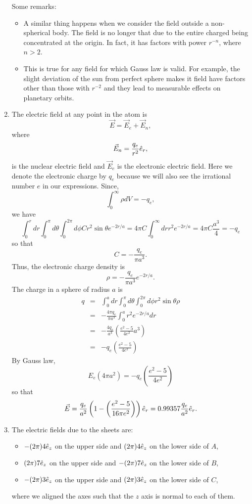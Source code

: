 \documentclass{article}
\begin{document}
\begin{enumerate}
Some remarks:
\begin{itemize}
\item A similar thing happens when we consider the field outside a non-spherical
body. The field is no longer that due to the entire charged being concentrated at 
the origin. In fact, it has factors with power $r^{-n}$, where $n > 2$.
\item This is true for any field for which Gauss law is valid. For example, the
slight deviation of the sun from perfect sphere makes it field have factors other
than those with $r^{-2}$ and they lead to measurable effects on planetary orbits.
\end{itemize}

\item The electric field at any point in the atom is
\[
\vec{E} = \vec{E}_e + \vec{E}_n,
\]
where
\[
\vec{E}_n = \frac{q_e}{r^2}\hat{e}_{r},
\]
is the nuclear electric field and $\vec{E}_e$ is the electronic electric field.
Here we denote the electronic charge by $q_e$ because we will also see the irrational
number $e$ in our expressions. Since,
\[
\int_0^\infty \rho dV = -q_e,
\]
we have
\[
\int_0^r dr \int_0^\pi d\theta \int_0^{2\pi}d\phi Cr^2\sin\theta  e^{-2r/a} = 
4\pi C\int_0^\infty dr r^2 e^{-2r/a} = 4\pi C\frac{a^3}{4} = -q_e
\]
so that 
\[
C = -\frac{q_e}{\pi a^3}.
\]
Thus, the electronic charge density is
\[
\rho = -\frac{q_e}{\pi a^3}e^{-2r/a}.
\]
The charge in a sphere of radius $a$ is
\begin{eqnarray*}
q &=& \int_0^a dr\int_0^\pi d\theta \int_0^{2\pi}d\phi r^2\sin\theta \rho \\
 &=& -\frac{4\pi q_e}{\pi a^3}\int_0^a r^2 e^{-2r/a}dr \\
 &=& -\frac{4q_e}{a^3}\left(\frac{e^2 - 5}{4e^2}a^3\right) \\
 &=& -q_e\left(\frac{e^2 - 5}{4e^2}\right)
\end{eqnarray*}
By Gauss law,
\[
E_e(4\pi a^2) = -q_e\left(\frac{e^2 - 5}{4e^2}\right)
\]
so that
\[
\vec{E} = \frac{q_e}{a^2}\left(1 - \left(\frac{e^2 - 5}{16\pi e^2}\right)\right)\hat{e}_{r}
= 0.99357\frac{q_e}{a^2}\hat{e}_{r}.
\]

\item The electric fields due to the sheets are:
\begin{itemize}
\item $-(2\pi)4\hat{e}_{z}$ on the upper side and $(2\pi)4\hat{e}_{z}$ on the lower side of $A$,
\item $(2\pi)7\hat{e}_{z}$ on the upper side and $-(2\pi)7\hat{e}_{z}$ on the lower side of $B$,
\item $-(2\pi)3\hat{e}_{z}$ on the upper side and $(2\pi)3\hat{e}_{z}$ on the lower side of $C$,
\end{itemize}
where we aligned the axes such that the $z$ axis is normal to each of them.


\end{enumerate}
\end{document}
